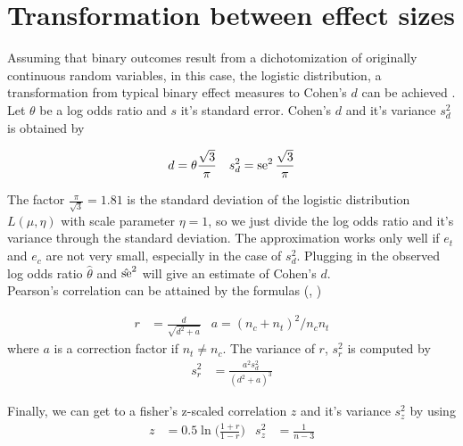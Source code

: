 \documentclass[11pt,a4paper,twoside]{book}\usepackage[]{graphicx}\usepackage[]{color}
\begin{document}
\section{Transformation between effect sizes} \label{sec:transformation.effectsizes}
Assuming that binary outcomes result from a dichotomization of originally continuous random variables, in this case, the logistic distribution, a transformation from typical binary effect measures to Cohen's $d$ can be achieved \cite[47]{Intro.meta}. \\
Let $\theta$ be a log odds ratio and $s$ it's standard error. Cohen's $d$ and it's variance $s_d^2$ is obtained by

\begin{align}
d &= \theta \frac{\sqrt{3}}{\pi} & s_d^2 =  \operatorname{se}^2\frac{\sqrt{3}}{\pi} \nonumber
\end{align}

The factor $\frac{\pi}{\sqrt{3}} = 1.81$ is the standard deviation of the logistic distribution $L(\mu, \eta)$ with scale parameter $\eta = 1$, so we just divide the log odds ratio and it's variance through the standard deviation. The approximation works only well if $e_t$ and $e_c$ are not very small, especially in the case of $s_d^2$. Plugging in the observed log odds ratio $\hat{\theta}$ and $\hat{\operatorname{se}}^2$ will give an estimate of Cohen's $d$.\\
Pearson's correlation can be attained by the formulas (\citet{olkin1985dtor}, \cite[48]{Intro.meta})

\begin{align}
r &= \frac{d}{\sqrt{d^2 + a}} & a = (n_c + n_t)^2 / n_c n_t \nonumber
\end{align}
where $a$ is a correction factor if $n_t \neq n_c$. The variance of $r$, $s_r^2$ is computed by
\begin{align}
s_r^2 &= \frac{a^2 s_d^2}{(d^2 + a)^3} \nonumber
\end{align}

Finally, we can get to a fisher's z-scaled correlation $z$ and it's variance $s_z^2$ by using
\begin{align}
z &= 0.5 \ln\big(\frac{1 + r}{1 - r}\big) & \nonumber
s_z^2 &= \frac{1}{n-3}
\end{align}
\end{document}
